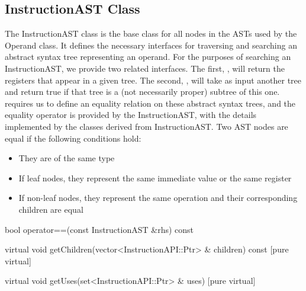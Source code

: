 \subsection{InstructionAST Class}
\label{sec:instructionAST}

The InstructionAST class is the base class for all nodes in the ASTs used by the
Operand class. It defines the necessary interfaces for traversing and searching
an abstract syntax tree representing an operand. For the purposes of searching
an InstructionAST, we provide two related interfaces. The first, ,
will return the registers that appear in a given tree. The second,
, will take as input another tree and return true if that tree is a
(not necessarily proper) subtree of this one.  requires us to
define an equality relation on these abstract syntax trees, and the equality
operator is provided by the InstructionAST, with the details implemented by the
classes derived from InstructionAST. Two AST nodes are equal if the following
conditions hold:

\begin{itemize}
\item They are of the same type
\item If leaf nodes, they represent the same immediate value or the same register
\item If non-\/leaf nodes, they represent the same operation and their corresponding children are equal 
\end{itemize}

\begin{apient}
bool operator==(const InstructionAST &rhs) const  
\end{apient}

\begin{apient}
virtual void getChildren(vector<InstructionAPI::Ptr> & children) const [pure
virtual]
\end{apient}

\begin{apient}
virtual void getUses(set<InstructionAPI::Ptr> & uses) [pure virtual]
\end{apient}

